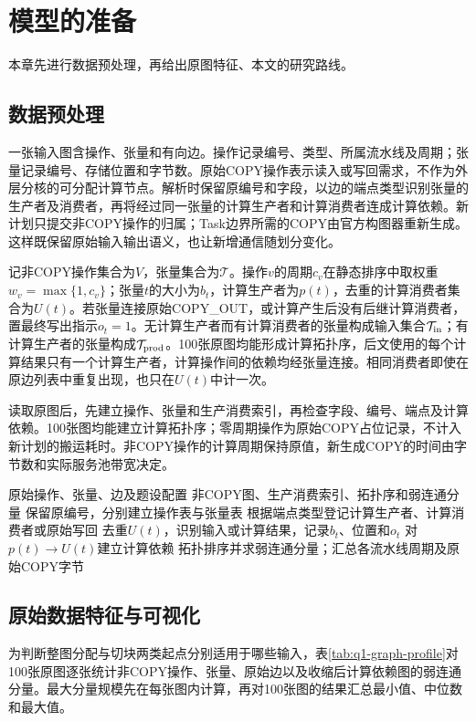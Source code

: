 \section{模型的准备}
本章先进行数据预处理，再给出原图特征、本文的研究路线。

\subsection{数据预处理}
一张输入图含操作、张量和有向边。操作记录编号、类型、所属流水线及周期；张量记录编号、存储位置和字节数。原始COPY操作表示读入或写回需求，不作为外层分核的可分配计算节点。解析时保留原编号和字段，以边的端点类型识别张量的生产者及消费者，再将经过同一张量的计算生产者和计算消费者连成计算依赖。新计划只提交非COPY操作的归属；Task边界所需的COPY由官方构图器重新生成。这样既保留原始输入输出语义，也让新增通信随划分变化。

记非COPY操作集合为$V$，张量集合为$\mathcal T$。操作$v$的周期$c_v$在静态排序中取权重$w_v=\max\{1,c_v\}$；张量$t$的大小为$b_t$，计算生产者为$p(t)$，去重的计算消费者集合为$U(t)$。若张量连接原始COPY\_OUT，或计算产生后没有后继计算消费者，置最终写出指示$o_t=1$。无计算生产者而有计算消费者的张量构成输入集合$\mathcal T_{\rm in}$；有计算生产者的张量构成$\mathcal T_{\rm prod}$。100张原图均能形成计算拓扑序，后文使用的每个计算结果只有一个计算生产者，计算操作间的依赖均经张量连接。相同消费者即使在原边列表中重复出现，也只在$U(t)$中计一次。

读取原图后，先建立操作、张量和生产消费索引，再检查字段、编号、端点及计算依赖。100张图均能建立计算拓扑序；零周期操作为原始COPY占位记录，不计入新计划的搬运耗时。非COPY操作的计算周期保持原值，新生成COPY的时间由字节数和实际服务池带宽决定。

\begin{algorithm}[H]\caption{计算依赖和张量接收域的预处理}
\begin{algorithmic}[1]
\REQUIRE 原始操作、张量、边及题设配置
\ENSURE 非COPY图、生产消费索引、拓扑序和弱连通分量
\STATE 保留原编号，分别建立操作表与张量表
\STATE 根据端点类型登记计算生产者、计算消费者或原始写回
\ENDFOR
{}
\STATE 去重$U(t)$，识别输入或计算结果，记录$b_t$、位置和$o_t$
\STATE 对$p(t)\to U(t)$建立计算依赖
\ENDFOR
\STATE 拓扑排序并求弱连通分量；汇总各流水线周期及原始COPY字节
\end{algorithmic}\end{algorithm}

\subsection{原始数据特征与可视化}
为判断整图分配与切块两类起点分别适用于哪些输入，表\ref{tab:q1-graph-profile}对100张原图逐张统计非COPY操作、张量、原始边以及收缩后计算依赖图的弱连通分量。最大分量规模先在每张图内计算，再对100张图的结果汇总最小值、中位数和最大值。

